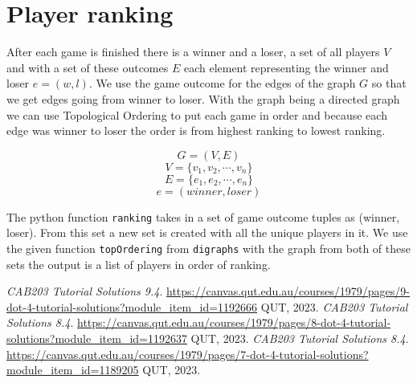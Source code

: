 \documentclass[a4paper]{article}
\begin{document}
\section{Player ranking}
After each game is finished there is a winner and a loser, a set of all players $V$ and with a set of these outcomes $E$ each element representing the winner and loser $e = (w, l)$. We use the game outcome for the edges of the graph $G$ so that we get edges going from winner to loser. With the graph being a directed graph we can use Topological Ordering to put each game in order and because each edge was winner to loser the order is from highest ranking to lowest ranking.
\begin{center}
\begin{Large}
\begin{equation}\label{eq:G}
    G = (V, E)
\end{equation}
\begin{equation}\label{eq:V}
    V = \{v_1, v_2, \cdots, v_n\}
\end{equation}
\begin{equation}\label{eq:E}
    E = \{e_1, e_2, \cdots, e_n\}
\end{equation}
\begin{equation}\label{eq:e}
    e = (winner, loser)
\end{equation}
\end{Large}
\end{center}
The python function \verb+ranking+ takes in a set of game outcome tuples as (winner, loser). From this set a new set is created with all the unique players in it. We use the given function \verb+topOrdering+ from \verb+digraphs+ with the graph from both of these sets the output is a list of players in order of ranking.
\begin{thebibliography}{9}
        \emph{CAB203 Tutorial Solutions 9.4}.
        \url{https://canvas.qut.edu.au/courses/1979/pages/9-dot-4-tutorial-solutions?module_item_id=1192666}
        QUT, 2023.
        \emph{CAB203 Tutorial Solutions 8.4}.
        \url{https://canvas.qut.edu.au/courses/1979/pages/8-dot-4-tutorial-solutions?module_item_id=1192637}
        QUT, 2023.
        \emph{CAB203 Tutorial Solutions 8.4}.
        \url{https://canvas.qut.edu.au/courses/1979/pages/7-dot-4-tutorial-solutions?module_item_id=1189205}
        QUT, 2023.
\end{thebibliography}
\end{document}
